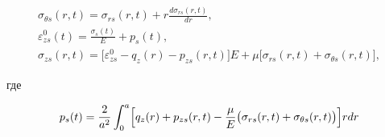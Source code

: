 \begin{gather}

\label{eq:38}

\sigma_{\theta s}(r, t) = \sigma_{r s}(r, t) + r \frac{d \sigma_{r s}(r, t)}{dr},


\\


\label{eq:39}

\varepsilon_{z s}^0(t) = \frac{\sigma_s (t)}{E} + p_s(t),






\\


\label{eq:40}

\sigma_{z s}(r, t)=\bigl[\varepsilon_{z s}^0 - q_z(r) - p_{z s} (r, t) \bigr]E + \mu 

\bigl[\sigma_{r s}(r, t)+\sigma_{\theta s}(r, t) \bigr],

\end{gather}

%





где

\begin{equation}

\label{eq:41}

p_{s}(t)=\frac{2}{a^2} \int_0^a \Bigl[q_z(r) + p_{z s} (r, t) - \frac{\mu}E \bigl(\sigma_{r s} (r, t) + \sigma_{\theta s} (r, t) \bigr)\Bigr]r dr \vspace{-2mm}

\end{equation}

